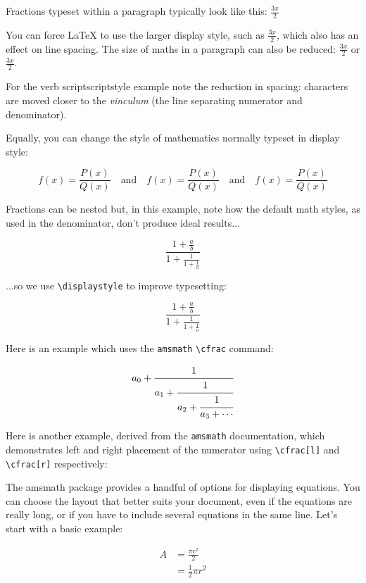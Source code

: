 \documentclass[12pt, letterpaper]{article}
\begin{document}
Fractions typeset within a paragraph typically look like this:
\(\frac{3x}{2}\)

You can force \LaTeX{} to use the larger display style,
such as \(\displaystyle \frac{3x}{2} \), which also has an effect on line spacing. The size of maths in a paragraph can also be reduced: \(\scriptstyle \frac{3x}{2}\) or \(\scriptscriptstyle \frac{3x}{2}\). 


For the verb scriptscriptstyle example note the reduction in spacing: characters are moved closer to the \textit{vinculum} (the line separating numerator and denominator).


Equally, you can change the style of mathematics normally typeset in display style:


\[f(x)=\frac{P(x)}{Q(x)}\quad \textrm{and}\quad \textstyle
f(x)=\frac{P(x)}{Q(x)}\quad \textrm{and}\quad \scriptstyle
f(x)=\frac{P(x)}{Q(x)}
\]



Fractions can be nested but, in this example, note how the default math styles, as used in the denominator, don't produce ideal results...


\[\frac{1+\frac{a}{b}} {1+\frac{1}{1+\frac{1}{a}}}\]


\noindent ...so we use \verb|\displaystyle| to improve typesetting:

\[\frac{1+\frac{a}{b}} {\displaystyle 1+\frac{1}{1+\frac{1}{a}}}\]

Here is an example which uses the \texttt{amsmath} \verb|\cfrac| command:


\[a_0+\cfrac{1}{a_1+\cfrac{1}{a_2+\cfrac{1}{a_3 +\cdots}}}\]

Here is another example, derived from the \texttt{amsmath} documentation, which demonstrates left
and right placement of the numerator using \verb|\cfrac[l]| and \verb|\cfrac[r]| respectively:

\newpage 
The amsmath package provides a handful of options for displaying equations. You can choose the layout that better suits your document, even if the equations are really long, or if you have to include several equations in the same line.
Let's start with a basic example:



\begin{equation} \label{eq1}
\begin{split}
A & = \frac{\pi r^2}{2}  \\
 & = \frac{1}{2} \pi r^2 
\end{split}
\end{equation}
\end{document}
